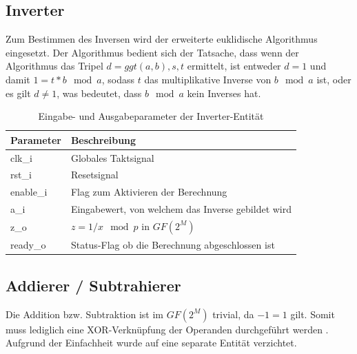 \subsection{Inverter}
Zum Bestimmen des Inversen wird der erweiterte euklidische Algorithmus eingesetzt. Der Algorithmus bedient sich der Tatsache, dass wenn der Algorithmus das Tripel $d = ggt(a, b), s, t$ ermittelt, ist entweder $d=1$ und damit $1 = t*b \mod a$, sodass $t$ das multiplikative Inverse von $b \mod a$ ist, oder es gilt $d \neq 1$, was bedeutet, dass $b \mod a$ kein Inverses hat. \\

\begin{table} [h]
	\centering 
	\begin{tabular}{ | p{3cm} | p{12cm} | }
		\hline
		\textbf{Parameter} & \textbf{Beschreibung}\\
		\hline
		clk\_i & Globales Taktsignal \\
		\hline
		rst\_i & Resetsignal \\
		\hline
		enable\_i & Flag zum Aktivieren der Berechnung \\
		\hline
		a\_i & Eingabewert, von welchem das Inverse gebildet wird \\
		\hline
		z\_o & $z = 1/x \mod p$ in $GF(2^M)$ \\
		\hline
		ready\_o & Status-Flag ob die Berechnung abgeschlossen ist  \\
		\hline
		\hline
	\end{tabular}
	\caption{Eingabe- und Ausgabeparameter der Inverter-Entität}
	\label{tab:vhdl-impl-inverter-param}
\end{table}

\subsection{Addierer / Subtrahierer}
Die Addition bzw. Subtraktion ist im $GF(2^M)$ trivial, da $-1 = 1$ gilt. Somit muss lediglich eine XOR-Verknüpfung der Operanden durchgeführt werden .  Aufgrund der Einfachheit wurde auf eine separate Entität verzichtet.

